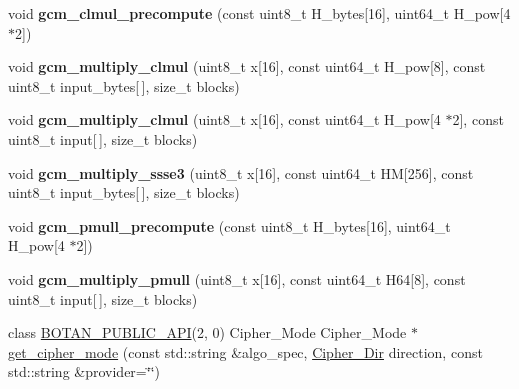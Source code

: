 \begin{DoxyCompactItemize}
\item 
\mbox{\label{namespace_botan_abaeb0902dcc750384b1b16719be1b39c}} 
void {\bfseries gcm\+\_\+clmul\+\_\+precompute} (const uint8\+\_\+t H\+\_\+bytes\mbox{[}16\mbox{]}, uint64\+\_\+t H\+\_\+pow\mbox{[}4 $\ast$2\mbox{]})
\item 
\mbox{\label{namespace_botan_acfa7355bae753bd73e73258f37d79a4c}} 
void {\bfseries gcm\+\_\+multiply\+\_\+clmul} (uint8\+\_\+t x\mbox{[}16\mbox{]}, const uint64\+\_\+t H\+\_\+pow\mbox{[}8\mbox{]}, const uint8\+\_\+t input\+\_\+bytes\mbox{[}$\,$\mbox{]}, size\+\_\+t blocks)
\item 
\mbox{\label{namespace_botan_acf958ceb4e98635a1393e9bcfaaf458e}} 
void {\bfseries gcm\+\_\+multiply\+\_\+clmul} (uint8\+\_\+t x\mbox{[}16\mbox{]}, const uint64\+\_\+t H\+\_\+pow\mbox{[}4 $\ast$2\mbox{]}, const uint8\+\_\+t input\mbox{[}$\,$\mbox{]}, size\+\_\+t blocks)
\item 
\mbox{\label{namespace_botan_ad53f90378aaccb4b9608b467ee421cf8}} 
void {\bfseries gcm\+\_\+multiply\+\_\+ssse3} (uint8\+\_\+t x\mbox{[}16\mbox{]}, const uint64\+\_\+t HM\mbox{[}256\mbox{]}, const uint8\+\_\+t input\+\_\+bytes\mbox{[}$\,$\mbox{]}, size\+\_\+t blocks)
\item 
\mbox{\label{namespace_botan_a0687dab8892053b8b0dc6600a37a2d46}} 
void {\bfseries gcm\+\_\+pmull\+\_\+precompute} (const uint8\+\_\+t H\+\_\+bytes\mbox{[}16\mbox{]}, uint64\+\_\+t H\+\_\+pow\mbox{[}4 $\ast$2\mbox{]})
\item 
\mbox{\label{namespace_botan_ae014acaf562e66a1137bfb574fae275d}} 
void {\bfseries gcm\+\_\+multiply\+\_\+pmull} (uint8\+\_\+t x\mbox{[}16\mbox{]}, const uint64\+\_\+t H64\mbox{[}8\mbox{]}, const uint8\+\_\+t input\mbox{[}$\,$\mbox{]}, size\+\_\+t blocks)
\item 
class \mbox{\hyperlink{namespace_botan_a6b9388030d872e586a4655b776ac9501}{B\+O\+T\+A\+N\+\_\+\+P\+U\+B\+L\+I\+C\+\_\+\+A\+PI}}(2, 0) Cipher\+\_\+\+Mode Cipher\+\_\+\+Mode $\ast$ \mbox{\hyperlink{namespace_botan_a9074784e382345388cdeb6db3e69c823}{get\+\_\+cipher\+\_\+mode}} (const std\+::string \&algo\+\_\+spec, \mbox{\hyperlink{namespace_botan_a8d9547a8fb3e868810b169b20ac389ee}{Cipher\+\_\+\+Dir}} direction, const std\+::string \&provider=\char`\"{}\char`\"{})

\end{DoxyCompactItemize}
